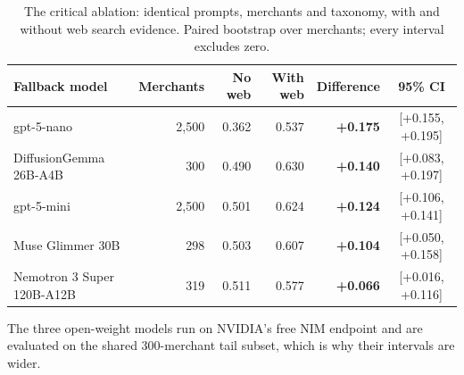 \begin{table}[t]
\centering
\caption{The critical ablation: identical prompts, merchants and taxonomy, with and without web search evidence. Paired bootstrap over merchants; every interval excludes zero.}
\label{tab:ablation}
\small
\begin{tabular}{lrrrrc}
\toprule
Fallback model & Merchants & No web & With web & Difference & 95\% CI\\
\midrule
gpt-5-nano & 2,500 & 0.362 & 0.537 & \textbf{+0.175} & [+0.155, +0.195] \\
DiffusionGemma 26B-A4B & 300 & 0.490 & 0.630 & \textbf{+0.140} & [+0.083, +0.197] \\
gpt-5-mini & 2,500 & 0.501 & 0.624 & \textbf{+0.124} & [+0.106, +0.141] \\
Muse Glimmer 30B & 298 & 0.503 & 0.607 & \textbf{+0.104} & [+0.050, +0.158] \\
Nemotron 3 Super 120B-A12B & 319 & 0.511 & 0.577 & \textbf{+0.066} & [+0.016, +0.116] \\
\bottomrule
\end{tabular}
\vspace{4pt}
\begin{minipage}{0.86\textwidth}\footnotesize The three open-weight models run on NVIDIA's free NIM endpoint and are evaluated on the shared 300-merchant tail subset, which is why their intervals are wider.\end{minipage}
\end{table}

